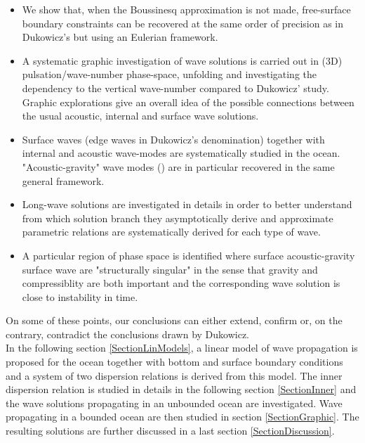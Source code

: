 \documentclass[a4paper,11pt]{article}
\begin{document}
\begin{itemize}
	\item We show that, when the Boussinesq approximation is not made, free-surface boundary constraints can be recovered at the same order of precision as in Dukowicz's but using an Eulerian framework.
	\item A systematic graphic investigation of wave solutions is carried out in (3D) pulsation/wave-number phase-space, unfolding and investigating the dependency to the vertical wave-number compared to Dukowicz' study. Graphic explorations give an overall idea of the possible connections between the usual acoustic, internal and surface wave solutions.
	\item Surface waves (edge waves in Dukowicz's denomination) together with internal and acoustic wave-modes are systematically studied in the ocean. "Acoustic-gravity" wave modes (\cite{smith_2015}) are in particular recovered in the same general framework. 
	\item Long-wave solutions are investigated in details in order to better understand from which solution branch they asymptotically derive and approximate parametric relations are systematically derived for each type of wave.
	\item A particular region of phase space is identified where surface acoustic-gravity surface wave are "structurally singular" in the sense that gravity and compressiblity are both important and the corresponding wave solution is close to instability in time.
\end{itemize}   
On some of these points, our conclusions can either extend, confirm or, on the contrary, contradict the conclusions drawn by Dukowicz.\\
In the following section \ref{SectionLinModels}, a linear model of wave propagation is proposed for the ocean together with bottom and surface boundary conditions and a system of two dispersion relations is derived from this model. The inner dispersion relation is studied in details in the following section \ref{SectionInner} and the wave solutions propagating in an unbounded ocean are investigated. Wave propagating in a bounded ocean are then studied in section \ref{SectionGraphic}. The resulting solutions are further discussed in a last section \ref{SectionDiscussion}.
\end{document}
